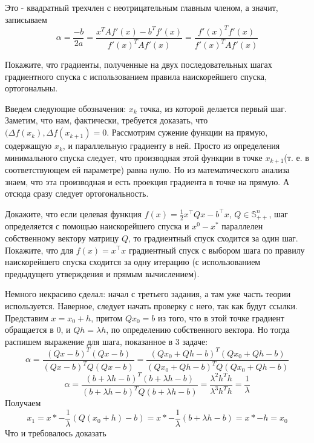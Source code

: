 \documentclass{article}
\begin{document}
Это - квадратный трехчлен с неотрицательным главным членом, а значит, записываем 
$$ \alpha = \frac{-b}{2a} = \frac{x^TAf'(x) - b^Tf'(x) }{f'(x)^TAf'(x)} = 
\frac{f'(x)^Tf'(x)}{f'(x)^TAf'(x)}
$$

Покажите, что градиенты, полученные на двух последовательных шагах градиентного спуска с использованием правила наискорейшего спуска, ортогональны. 

Введем следующие обозначения: $x_k$ точка, из которой делается первый шаг.
Заметим, что нам, фактически, требуется доказать, что $(\Delta f(x_k), \Delta f(x_{k+1}) = 0$. Рассмотрим сужение функции на прямую, содержащую $x_k$, и параллельную градиенту в ней.
Просто из определения минимального спуска следует, что производная этой функции в точке $x_{k + 1}$(т. е. в соответствующем ей параметре) равна нулю. Но из математического анализа
знаем, что эта производная и есть проекция градиента в точке на прямую. А отсюда сразу следует ортогональность.

Докажите, что если целевая функция $f(x) = \frac{1}{2}x^{\top}Qx - b^{\top}x$, $Q \in \mathbb{S}^n_{++}$, шаг определяется с помощью наискорейшего спуска и $x^0 - x^*$ параллелен собственному вектору матрицу $Q$, то градиентный спуск сходится за один шаг. Покажите, что для $f(x) = x^{\top}x$ градиентный спуск с выбором шага по правилу наискорейшего спуска сходится за одну итерацию (с использованием предыдущего утверждения и прямым вычислением).

Немного некрасиво сделал: начал с третьего задания, а там уже часть теории используется. Наверное, следует начать проверку с него, так как будут ссылки. Представим $x = x_0 + h$,
притом $Qx_0 = b$ из  того, что в этой точке градиент обращается в 0, и $Qh = \lambda h$,
по определению собственного вектора. Но тогда распишем выражение для шага, показанное в 3
задаче: 
$$\alpha =  \frac{(Qx - b)^T(Qx - b)}{(Qx - b)^TQ(Qx - b)} = 
 \frac{(Qx_0 + Qh - b)^T(Qx_0 + Qh - b)}{(Qx_0 + Qh - b)^TQ(Qx_0 + Qh - b)}
$$ 
$$\alpha = 
\frac{(b + \lambda h - b)^T(b + \lambda h - b)}{(b + \lambda h - b)^TQ(b + \lambda h - b)} =
\frac{\lambda^2 h^T h}{\lambda^3 h^T h } = \frac{1}{\lambda}
$$
Получаем $$ x_1 = x* - \frac{1}{\lambda}(Q(x_0 + h) - b) =
x* - \frac{1}{\lambda}(b + \lambda h - b) = x* - h = x_0
$$
Что и требовалось доказать
\end{document}
